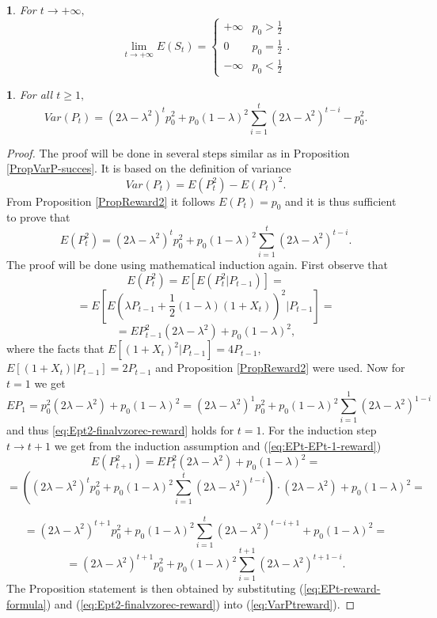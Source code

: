 \documentclass{amsart}
\theoremstyle{definition}
\theoremstyle{plain}
\newtheorem{prop}[thm]{\protect\propositionname}
\theoremstyle{plain}
\newtheorem{cor}[thm]{\protect\corollaryname}
\numberwithin{equation}{section}
\providecommand{\corollaryname}{Corollary}
\providecommand{\propositionname}{Proposition}
\begin{document}
\begin{cor}
For $t\rightarrow+\infty,$ \textup{
\[
\lim_{t\to+\infty}E(S_{t})=\begin{cases}
+\infty & p_{0}>\frac{1}{2}\\
0 & p_{0}=\frac{1}{2}\\
-\infty & p_{0}<\frac{1}{2}
\end{cases}.
\]
}
\end{cor}

\begin{prop}
For all $t\geq1,$ 
\begin{equation}
Var(P_{t})=(2\lambda-\lambda^{2})^{t}p_{0}^{2}+p_{0}(1-\lambda)^{2}\sum_{i=1}^{t}(2\lambda-\lambda^{2})^{t-i}-p_{0}^{2}.\label{eq:VarPt-reward-prop}
\end{equation}
\end{prop}
\begin{proof}
The proof will be done in several steps similar as in Proposition
\ref{PropVarP-succes}. It is based on the definition of variance
\begin{equation}
Var(P_{t})=E(P_{t}^{2})-E(P_{t})^{2}.\label{eq:VarPtreward}
\end{equation}
From Proposition \ref{PropReward2} it follows $E(P_{t})=p_{0}$ and
it is thus sufficient to prove that 
\begin{equation}
E(P_{t}^{2})=(2\lambda-\lambda^{2})^{t}p_{0}^{2}+p_{0}(1-\lambda)^{2}\sum_{i=1}^{t}(2\lambda-\lambda^{2})^{t-i}.\label{eq:Ept2-finalvzorec-reward}
\end{equation}
The proof will be done using mathematical induction again. First observe that
\[
E(P_{t}^{2})=E[E(P_{t}^{2}|P_{t-1})]=
\]
\[
=E[E(\lambda P_{t-1}+\frac{1}{2}(1-\lambda)(1+X_{t}))^{2}|P_{t-1}]=
\]
\begin{equation}
=EP_{t-1}^{2}(2\lambda-\lambda^{2})+p_{0}(1-\lambda)^{2},\label{eq:EPt-EPt-1-reward}
\end{equation}
where the facts that $E[(1+X_{t})^{2}|P_{t-1}]=4P_{t-1}$, $E[(1+X_{t})|P_{t-1}]=2P_{t-1}$
and Proposition \ref{PropReward2} were used. Now for $t=1$ we get
\[
EP_{1}=p_{0}^{2}(2\lambda-\lambda^{2})+p_{0}(1-\lambda)^{2}=(2\lambda-\lambda^{2})^{1}p_{0}^{2}+p_{0}(1-\lambda)^{2}\sum_{i=1}^{1}(2\lambda-\lambda^{2})^{1-i}
\]
and thus \eqref{eq:Ept2-finalvzorec-reward} holds for $t=1$. For the induction step $t\rightarrow t+1$
we get from the induction assumption and (\ref{eq:EPt-EPt-1-reward})
\[
E(P_{t+1}^{2})=EP_{t}^{2}(2\lambda-\lambda^{2})+p_{0}(1-\lambda)^{2}=
\]
\[
=((2\lambda-\lambda^{2})^{t}p_{0}^{2}+p_{0}(1-\lambda)^{2}\sum_{i=1}^{t}(2\lambda-\lambda^{2})^{t-i})\cdot(2\lambda-\lambda^{2})+p_{0}(1-\lambda)^{2}=
\]
 
\[
=(2\lambda-\lambda^{2})^{t+1}p_{0}^{2}+p_{0}(1-\lambda)^{2}\sum_{i=1}^{t}(2\lambda-\lambda^{2})^{t-i+1}+p_{0}(1-\lambda)^{2}=
\]
\[
=(2\lambda-\lambda^{2})^{t+1}p_{0}^{2}+p_{0}(1-\lambda)^{2}\sum_{i=1}^{t+1}(2\lambda-\lambda^{2})^{t+1-i}.
\]
The Proposition statement is then obtained by substituting (\ref{eq:EPt-reward-formula})
and (\ref{eq:Ept2-finalvzorec-reward}) into (\ref{eq:VarPtreward}).
\end{proof}
\end{document}
